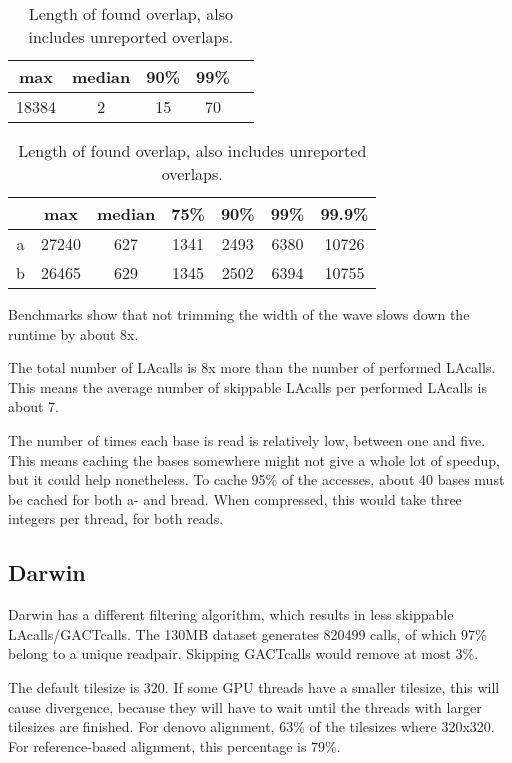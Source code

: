 \documentclass[../main/thesis.tex]{subfiles}
\begin{document}
\begin{table}[h]
\bigskip
\caption{Number of skippable LAcalls per performed LAcall}
\label{tbl:daligner_dist6}
\centering
\vspace{-5pt}
\begin{tabular}{c|c c c c}
max & median & 90\% & 99\% \\ \hline
18384 & 2 & 15 & 70 \\
\end{tabular}

\bigskip
\caption{Length of found overlap, also includes unreported overlaps.}
\label{tbl:daligner_dist7}
\centering
\vspace{-5pt}
\begin{tabular}{c|c c c c c c}
& max & median & 75\% & 90\% & 99\% & 99.9\% \\ \hline
a & 27240 & 627 & 1341 & 2493 & 6380 & 10726 \\
b & 26465 & 629 & 1345 & 2502 & 6394 & 10755 \\
\end{tabular}
\end{table}


Benchmarks show that not trimming the width of the wave slows down the runtime by about 8x.

The total number of LAcalls is 8x more than the number of performed LAcalls.
This means the average number of skippable LAcalls per performed LAcalls is about 7.

The number of times each base is read is relatively low, between one and five.
This means caching the bases somewhere might not give a whole lot of speedup, but it could help nonetheless.
To cache 95\% of the accesses, about 40 bases must be cached for both a- and bread.
When compressed, this would take three integers per thread, for both reads.

\subsection{Darwin}
Darwin has a different filtering algorithm, which results in less skippable LAcalls/GACTcalls.
The 130MB dataset generates 820499 calls, of which 97\% belong to a unique readpair.
Skipping GACTcalls would remove at most 3\%.


The default tilesize is 320.
If some GPU threads have a smaller tilesize, this will cause divergence, because they will have to wait until the threads with larger tilesizes are finished.
For denovo alignment, 63\% of the tilesizes where 320x320.
For reference-based alignment, this percentage is 79\%.
\end{document}
